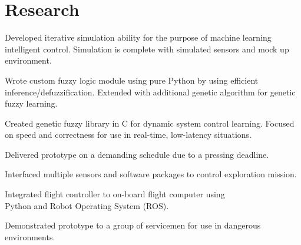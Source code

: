 \documentclass[letterpaper]{deedy-resume}
\begin{document}
\begin{minipage}[t]{\textwidth}
    \section{Research}
    \begin{compactitem}
        \item Developed iterative simulation ability for the purpose of machine learning intelligent control.
            \subitem Simulation is complete with simulated sensors and mock up environment.
        \item Wrote custom fuzzy logic module using pure Python by using efficient inference/defuzzification.
            \subitem Extended with additional genetic algorithm for genetic fuzzy learning.
        \item Created genetic fuzzy library in C for dynamic system control learning.
            \subitem Focused on speed and correctness for use in real-time, low-latency situations.
    \end{compactitem}
    
    \vspace*{2ex}
    \begin{compactitem}
        \item Delivered prototype on a demanding schedule due to a pressing deadline.
        \item Interfaced multiple sensors and software packages to control exploration mission.
        \item Integrated flight controller to on-board flight computer using\\Python and Robot Operating System (ROS).
        \item Demonstrated prototype to a group of servicemen for use in dangerous environments.
    \end{compactitem}
    

\end{minipage}
\end{document}
